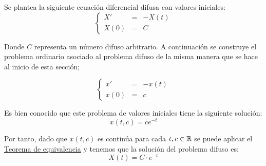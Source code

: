 \begin{ejemplo}
	Se plantea la siguiente ecuación diferencial difusa con valores iniciales:
	\[
		\left\{
			\begin{array}{ccc}
				X' & = & - X(t) \\
				X(0) & =  & C
			\end{array}
		\right.
	\]
	
	Donde $C$ representa un número difuso arbitrario. A continuación se construye el problema ordinario asociado al problema difuso de la misma manera que se hace al inicio de esta sección;
	
	\[
		\left\{
			\begin{array}{ccc}
				x' & = & - x(t) \\
				x(0) & =  & c
			\end{array}
		\right.
	\]
	
	Es bien conocido que este problema de valores iniciales tiene la siguiente solución:
	\[
		x(t, c) = c e^{-t}
	\]
	
	Por tanto, dado que $x(t, c)$ es continúa para cada $t, c \in \mathbb R$ se puede aplicar el \hyperref[teorema:equivalencia]{Teorema de equivalencia} y tenemos que la solución del problema difuso es:
	\[
		X(t) = C \cdot e^{-t}
	\]
\end{ejemplo}

